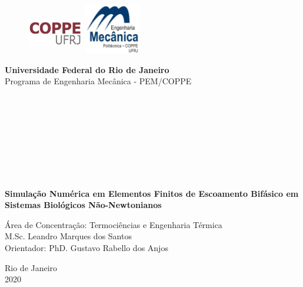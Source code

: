 \begin{titlepage}
\begin{center}


  \begin{figure}[hbt!]
		          \includegraphics[width=2.44cm,height=1.8cm]{figure/coppe.png}
		   \hfill \includegraphics[width=2.44cm,height=2.17cm]{figure/pem.png}
  \end{figure}



  \vspace{-2cm}
  \hspace{0cm}\large{\textbf{Universidade Federal do Rio de Janeiro}}\\
  \hspace{0cm}\large{Programa de Engenharia Mecânica - PEM/COPPE}\\

  \hspace{2cm}\large{}\\
  \hspace{2cm}\large{}\\
  \hspace{2cm}\large{}\\
  \hspace{2cm}\large{}\\

  \hspace{2cm}\large{}\\
  \hspace{2cm}\large{}\\
  \hspace{2cm}\large{}\\
  \hspace{2cm}\large{}\\


  \par
  \vspace{1cm}
  \textbf{\LARGE \justifying Simulação Numérica em Elementos Finitos de Escoamento Bifásico em Sistemas Biológicos Não-Newtonianos }

  \par
  \vspace{0.5cm}
  {Área de Concentração: Termociências e Engenharia Térmica}\\
  \vspace{0.5cm}
  {M.Sc. Leandro Marques dos Santos}\\
  \vspace{0.3cm}
  {Orientador: PhD. Gustavo Rabello dos Anjos}



  \par\vfill
  {\large Rio de Janeiro\\2020}

\end{center}
\end{titlepage}
